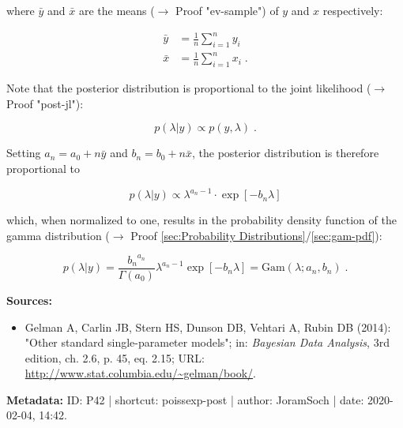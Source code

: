 \documentclass[a4paper,12pt]{book}
\begin{document}
where $\bar{y}$ and $\bar{x}$ are the means ($\rightarrow$ Proof "ev-sample") of $y$ and $x$ respectively:

\begin{equation} \label{eq:poissexp-post-xy-mean}
\begin{split}
\bar{y} &= \frac{1}{n} \sum_{i=1}^n y_i \\
\bar{x} &= \frac{1}{n} \sum_{i=1}^n x_i \; .
\end{split}
\end{equation}

Note that the posterior distribution is proportional to the joint likelihood ($\rightarrow$ Proof "post-jl"):

\begin{equation} \label{eq:poissexp-post-Poiss-exp-post-s1}
p(\lambda|y) \propto p(y,\lambda) \; .
\end{equation}

Setting $a_n = a_0 + n \bar{y}$ and $b_n = b_0 + n \bar{x}$, the posterior distribution is therefore proportional to

\begin{equation} \label{eq:poissexp-post-Poiss-exp-post-s2}
p(\lambda|y) \propto \lambda^{a_n-1} \cdot \exp\left[-b_n \lambda\right]
\end{equation}

which, when normalized to one, results in the probability density function of the gamma distribution ($\rightarrow$ Proof \ref{sec:Probability Distributions}/\ref{sec:gam-pdf}):

\begin{equation} \label{eq:poissexp-post-Poiss-exp-post-s3}
p(\lambda|y) = \frac{ {b_n}^{a_n}}{\Gamma(a_0)} \lambda^{a_n-1} \exp\left[-b_n \lambda\right] = \mathrm{Gam}(\lambda; a_n, b_n) \; .
\end{equation}

\vspace{1em}
\textbf{Sources:}
\begin{itemize}
\item Gelman A, Carlin JB, Stern HS, Dunson DB, Vehtari A, Rubin DB (2014): "Other standard single-parameter models"; in: \textit{Bayesian Data Analysis}, 3rd edition, ch. 2.6, p. 45, eq. 2.15; URL: \url{http://www.stat.columbia.edu/~gelman/book/}.
\end{itemize}


\vspace{1em}
\textbf{Metadata:} ID: P42 | shortcut: poissexp-post | author: JoramSoch | date: 2020-02-04, 14:42.
\end{document}
